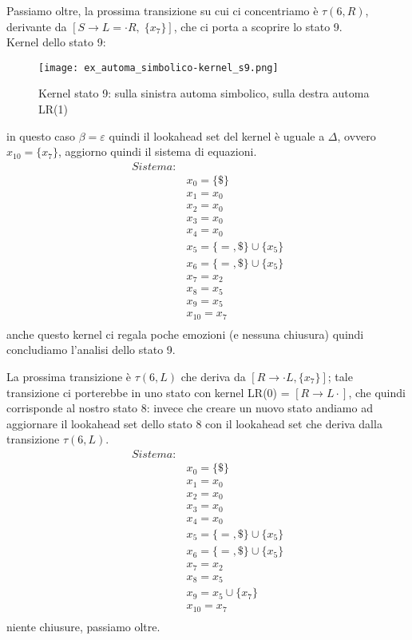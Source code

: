 \documentclass[class=book, crop=false, oneside, 12pt]{standalone}
\begin{document}
Passiamo oltre, la prossima transizione su cui ci concentriamo è \(\tau(6, R)\), derivante da \([S \to L = \cdot R, \; \{x_7\}]\), che ci porta a scoprire lo stato 9.
\\
Kernel dello stato 9:
\begin{figure}[h!]
    \centering
    \texttt{[image: ex\_automa\_simbolico-kernel\_s9.png]}
    \caption{Kernel stato 9: sulla sinistra automa simbolico, sulla destra automa LR(1)}
\end{figure}
in questo caso  \(\beta = \varepsilon\) quindi il lookahead set del kernel è uguale a \(\Delta\), ovvero \(x_{10} = \{x_7\}\), aggiorno quindi il sistema di equazioni.
\begin{align*}
    Sistema:& \\
            & x_0 = \{\$\} \\
            & x_1 = x_0 \\
            & x_2 = x_0 \\
            & x_3 = x_0 \\
            & x_4 = x_0 \\
            & x_5 = \{=, \$\} \cup \{x_5\} \\
            & x_6 = \{=, \$\} \cup \{x_5\} \\
            & x_7 = x_2 \\
            & x_8 = x_5 \\
            & x_9 = x_5 \\
            & x_{10} = x_7 \\
\end{align*}
anche questo kernel ci regala poche emozioni (e nessuna chiusura) quindi concludiamo l'analisi dello stato 9.

La prossima transizione è \(\tau(6, L)\) che deriva da \([R \to \cdot L, \{x_7\}]\); tale transizione ci porterebbe in uno stato con kernel LR(0) = \([R \to L \cdot ]\), che quindi corrisponde al nostro stato 8: invece che creare un nuovo stato andiamo ad aggiornare il lookahead set dello stato 8 con il lookahead set che deriva dalla transizione \(\tau(6, L)\).
\begin{align*}
    Sistema:& \\
            & x_0 = \{\$\} \\
            & x_1 = x_0 \\
            & x_2 = x_0 \\
            & x_3 = x_0 \\
            & x_4 = x_0 \\
            & x_5 = \{=, \$\} \cup \{x_5\} \\
            & x_6 = \{=, \$\} \cup \{x_5\} \\
            & x_7 = x_2 \\
            & x_8 = x_5 \\
            & x_9 = x_5 \cup \{x_7\} \\
            & x_{10} = x_7 \\
\end{align*}
niente chiusure, passiamo oltre.
\end{document}
